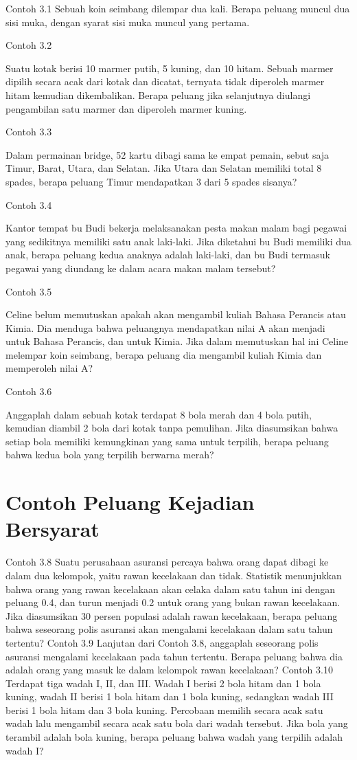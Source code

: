 \documentclass[11pt,fleqn]{book} %
\begin{document}
{{Contoh 3.1
Sebuah koin seimbang dilempar dua kali. Berapa peluang muncul dua sisi muka, dengan syarat sisi muka muncul yang pertama.

Contoh 3.2

Suatu kotak berisi 10 marmer putih, 5 kuning, dan 10 hitam. Sebuah marmer dipilih secara acak dari kotak dan dicatat, ternyata tidak diperoleh marmer hitam kemudian dikembalikan. Berapa peluang jika selanjutnya diulangi pengambilan satu marmer dan diperoleh marmer kuning.

Contoh 3.3

Dalam permainan bridge, 52 kartu dibagi sama ke empat pemain, sebut saja Timur, Barat, Utara, dan Selatan. Jika Utara dan Selatan memiliki total 8 spades, berapa peluang Timur mendapatkan 3 dari 5 spades sisanya?

Contoh 3.4

Kantor tempat bu Budi bekerja melaksanakan pesta makan malam bagi pegawai yang sedikitnya memiliki satu anak laki-laki. Jika diketahui bu Budi memiliki dua anak, berapa peluang kedua anaknya adalah laki-laki, dan bu Budi termasuk pegawai yang diundang ke dalam acara makan malam tersebut?

Contoh 3.5

Celine belum memutuskan apakah akan mengambil kuliah Bahasa Perancis atau Kimia. Dia menduga bahwa peluangnya mendapatkan nilai A akan menjadi  untuk Bahasa Perancis, dan   untuk Kimia. Jika dalam memutuskan hal ini Celine melempar koin seimbang, berapa peluang dia mengambil kuliah Kimia dan memperoleh nilai A?

Contoh 3.6

Anggaplah dalam sebuah kotak terdapat 8 bola merah dan 4 bola putih, kemudian diambil 2 bola dari kotak tanpa pemulihan. Jika diasumsikan bahwa setiap bola memiliki kemungkinan yang sama untuk terpilih, berapa peluang bahwa kedua bola yang terpilih berwarna merah?


\section{Contoh Peluang Kejadian Bersyarat}
Contoh 3.8
Suatu perusahaan asuransi percaya bahwa orang dapat dibagi ke dalam dua kelompok, yaitu rawan kecelakaan dan tidak. Statistik menunjukkan bahwa orang yang rawan kecelakaan akan celaka dalam satu tahun ini dengan peluang 0.4, dan turun menjadi 0.2 untuk orang yang bukan rawan kecelakaan. Jika diasumsikan 30 persen populasi adalah rawan kecelakaan, berapa peluang bahwa seseorang polis asuransi akan mengalami kecelakaan dalam satu tahun tertentu?
Contoh 3.9
Lanjutan dari Contoh 3.8, anggaplah seseorang polis asuransi mengalami kecelakaan pada tahun tertentu. Berapa peluang bahwa dia adalah orang yang masuk ke dalam kelompok rawan kecelakaan?
Contoh 3.10
Terdapat tiga wadah I, II, dan III. Wadah I berisi 2 bola hitam dan 1 bola kuning, wadah II berisi 1 bola hitam dan 1 bola kuning, sedangkan wadah III berisi 1 bola hitam dan 3 bola kuning. Percobaan memilih secara acak satu wadah lalu mengambil secara acak satu bola dari wadah tersebut. Jika bola yang terambil adalah bola kuning, berapa peluang bahwa wadah yang terpilih adalah wadah I?

}}
\end{document}
